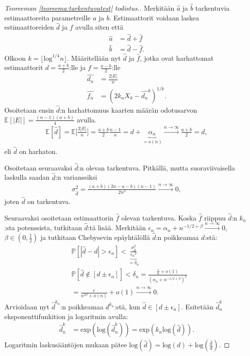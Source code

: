 \documentclass[finnish,12pt,a4paper,pdftex,sci,utf8]{aaltothesis}
\newcommand\floor[1]{\lfloor#1\rfloor}
\begin{document}
\begin{proof}[Teoreeman \ref{teoreema:tarkentuvatest} todistus.]
	Merkitään $\hat{a}$ ja $\hat{b}$ tarkentuvia estimaattoreita parametreille $a$ ja $b$. Estimaattorit voidaan laskea estimaattoreiden $\hat{d}$ ja $\hat{f}$ avulla siten että 
	\begin{align*}
		\hat{a} &= \hat{d} + \hat{f} \\
		\hat{b} &= \hat{d} - \hat{f}.
	\end{align*}
	Olkoon $k = \floor{\text{log}^{1/4}n}$. Määritellään nyt $\hat{d}$ ja $\hat{f}$, jotka ovat harhattomat estimaattorit $d = \frac{a+b}{2}$:lle ja $f = \frac{a-b}{2}$:lle
	\begin{align*}
		\hat{d_n} &= \frac{2\left|E\right|}{n} \\
		\hat{f_n} &= (2 k_n X_k - \hat{d_n}^{k})^{1/k}.
	\end{align*}
	Osoitetaan ensin $\hat{d}$:n harhattomuus kaarten määrän odotusarvon $\mathbb{E}[|E|] = \frac{(n-1)(a+b)}{4}$ avulla.
	\begin{align*}
		\mathbb{E}[\hat{d}] = \mathbb{E}\bigg[ \frac{2|E|}{n} \bigg] = \frac{a+b}{2}\frac{n-1}{n} = d + \underbrace{\alpha_n}_{= o(n)} \xrightarrow{n \rightarrow \infty}\frac{a+b}{2} = d,
	\end{align*}
	eli $\hat{d}$ on harhaton.

	Osoitetaan seuraavaksi $\hat{d}$:n olevan tarkentuva. Pitkällä, mutta suoraviivaisella laskulla saadan $\hat{d}$:n varianssiksi 
	\begin{align*}
		\sigma_{\hat{d}}^2 = \frac{(a+b)(2n-a-b)(n-1)}{2n^3} \xrightarrow{n \rightarrow \infty} 0,
	\end{align*}
	joten $\hat{d}$ on tarkentuva.

	Seuraavaksi osoitetaan estimaattorin $\hat{f}$ olevan tarkentuva. Koska $\hat{f}$ riippuu $\hat{d}$:n $k_n$:sta potenssista, tutkitaan $\hat{d}$:tä lisää. Merkitään $\epsilon_{n}^{} = \alpha_n + n^{-1/2 + \beta} \xrightarrow{n \rightarrow \infty} 0 $, $\beta \in (0,\frac{1}{2})$ ja tutkitaan Chebysevin epäyhtälöllä $\hat{d}$:n poikkeamaa $d$:stä:
	\begin{align*}
		&\mathbb{P}[|\hat{d} - d| > \epsilon_{n}^{}] < \underbrace{\frac{\sigma_{\hat{d}}^2}{{\epsilon_{n}^{}}^2}}_{ = \delta_n} \\
		&\mathbb{P}[\hat{d} \notin [d \pm  \epsilon_{n}^{}]] < \delta_n = \frac{\frac{c}{n} + o(1)}{(\alpha_n + n^{-1/2 + \beta})^2} \\
		&= \frac{c}{{n^{2 \beta}} +  o(n)} + o(1) \xrightarrow{n \rightarrow \infty} 0.
	\end{align*}
	Arvioidaan nyt $\hat{d}^{k_n}$:n poikkeamaa $d^{k_n}$:stä, kun $\hat{d} \in [d \pm \epsilon_{n}^{}]$.
	Esitetään $\hat{d}^k_n$ eksponenttifunkition ja logaritmin avulla:
	\begin{align*}
		\hat{d}^k_n &= \text{exp}(\text{log}(\hat{d}^k_n)) = \text{exp}(k_n \text{log}(\hat{d})).
	\end{align*}
	Logaritmin laskusääntöjen mukaan pätee $\text{log}(\hat{d}) = \text{log}(d) + \text{log}(\frac{\hat{d}}{d})$.


\end{proof}
\end{document}
